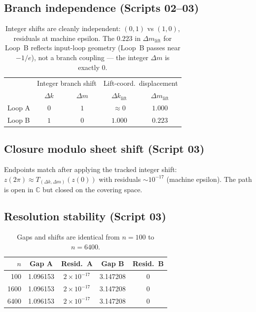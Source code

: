 \documentclass[11pt]{article}
\begin{document}
\subsection{Branch independence (Scripts 02--03)}

\begin{table}[h]
\centering
\begin{tabular}{l cc cc}
\toprule
 & \multicolumn{2}{c}{Integer branch shift}
 & \multicolumn{2}{c}{Lift-coord.\ displacement} \\
 & $\Delta k$ & $\Delta m$
 & $\Delta k_{\mathrm{lift}}$ & $\Delta m_{\mathrm{lift}}$ \\
\midrule
Loop A & $0$ & $1$ & $\approx 0$ & $1.000$ \\
Loop B & $1$ & $0$ & $1.000$     & $0.223$ \\
\bottomrule
\end{tabular}
\caption{Integer shifts are cleanly independent: $(0,1)$ vs $(1,0)$,
  residuals at machine epsilon.
  The $0.223$ in $\Delta m_{\mathrm{lift}}$ for Loop~B reflects
  input-loop geometry (Loop~B passes near $-1/e$), not a branch
  coupling --- the integer $\Delta m$ is exactly $0$.}
\end{table}

\subsection{Closure modulo sheet shift (Script 03)}

Endpoints match after applying the tracked integer shift:
$z(2\pi) \approx T_{(\Delta k,\Delta m)}(z(0))$ with residuals
$\sim\!10^{-17}$ (machine epsilon). The path is open in $\mathbb{C}$
but closed on the covering space.

\subsection{Resolution stability (Script 03)}

\begin{table}[h]
\centering
\begin{tabular}{r cccc}
\toprule
$n$ & Gap A & Resid.\ A & Gap B & Resid.\ B \\
\midrule
100  & 1.096153 & $2\times10^{-17}$ & 3.147208 & $0$ \\
1600 & 1.096153 & $2\times10^{-17}$ & 3.147208 & $0$ \\
6400 & 1.096153 & $2\times10^{-17}$ & 3.147208 & $0$ \\
\bottomrule
\end{tabular}
\caption{Gaps and shifts are identical from $n=100$ to $n=6400$.}
\end{table}
\end{document}
